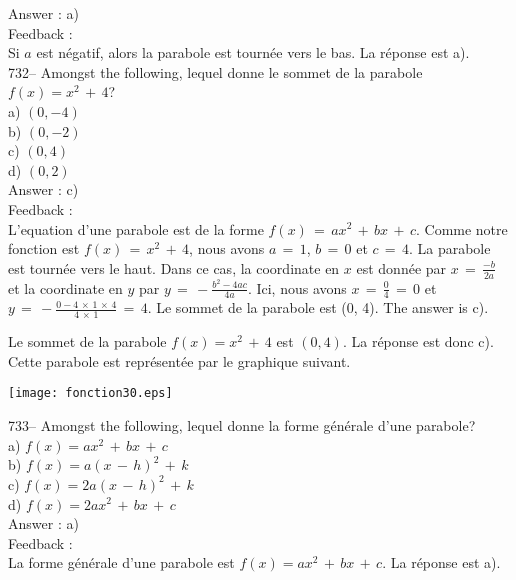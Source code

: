 \documentclass[letterpaper, 12pt]{article}
\begin{document}
Answer : a)\\

Feedback : \\
Si $a$ est n\'egatif, alors la parabole est tourn\'ee vers le bas.  La
r\'eponse est a).\\

732-- Amongst the following, lequel donne le sommet de la parabole
$f\left( x\right) =x^{2}\,+\,4$?\\
a) $(0,-4)$\\
b) $(0,-2)$\\
c) $(0,4)$\\
d) $(0,2)$\\

Answer : c)\\

Feedback : \\
L'equation d'une parabole est de la forme
$f(x)\,=\,ax^2\,+\,bx\,+\,c$. Comme notre fonction est
$f(x)\,=\,x^2\,+\,4$, nous avons $a\,=\,1$, $b\,=\,0$ et $c\,=\,4$.
La parabole est tourn\'ee vers le haut. Dans ce cas, la coordinate
en $x$ est donn\'ee par $x\,=\, \frac{-b}{2a}$ et la coordinate en
$y$ par $y\,=\, -\frac{b^2-4ac}{4a}$. Ici, nous avons
$x\,=\,\frac{0}{4}\,=\,0$ et
$y\,=\,-\frac{0-4\,\times\,1\,\times\,4}{4\,\times\,1}\,=\,4$. Le
sommet de la parabole est (0, 4). The answer is c).


Le sommet de la parabole $f\left( x\right) =x^{2}\,+\,4$ est $(0,4)$.  La
r\'eponse est donc c).  Cette parabole est repr\'esent\'ee par le graphique
suivant.\\
    \begin{center}
    \texttt{[image: fonction30.eps]}
    \end{center}

733-- Amongst the following, lequel donne la forme g\'en\'erale
d'une parabole?\\
a) $f(x)=ax^{2}\,+\,bx\,+\,c$\\
b) $f(x)=a(x\,-\,h)^{2}\,+\,k$\\
c) $f(x)=2a(x\,-\,h)^{2}\,+\,k$\\
d) $f(x)=2ax^{2}\,+\,bx\,+\,c$\\

Answer : a)\\

Feedback : \\
La forme g\'en\'erale d'une parabole est $f(x)=ax^{2}\,+\,bx\,+\,c$.  La
r\'eponse est a).\\
\end{document}
